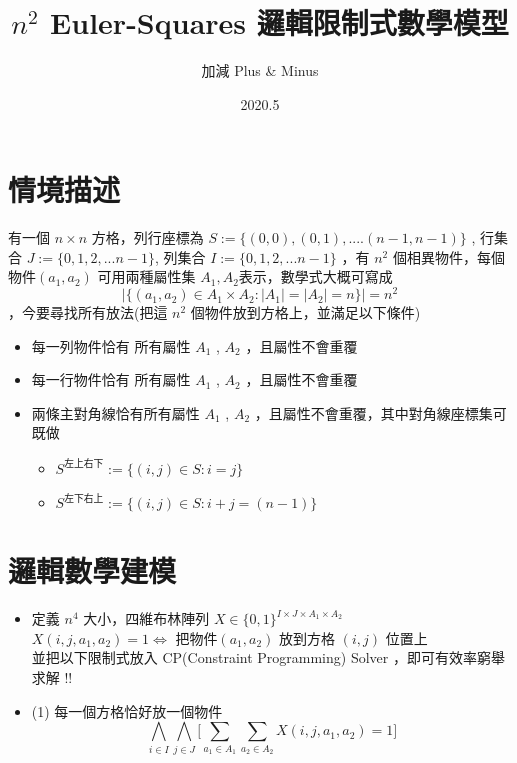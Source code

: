 \documentclass{article}
\begin{document}
\begin{CJK}{UTF8}{bsmi}


\title{$n^2$ Euler-Squares 邏輯限制式數學模型}
\date{2020.5}
\author{加減 Plus \& Minus}


\maketitle
\section{情境描述}
有一個 $n \times n$ 方格，列行座標為 $ S := \bigg\{(0,0),(0,1),....(n-1,n-1)\bigg\}$ , 行集合  $ J := \bigg\{0,1,2,...n-1 \bigg\}$,  列集合 $ I := \bigg\{0,1,2,...n-1 \bigg\}$ ，有 $n^2$ 個相異物件，每個物件$(a_1,a_2)$ 可用兩種屬性集 $A_1 , A_2$表示，數學式大概可寫成 $$\left|\bigg\{ (a_1,a_2) \in A_1 \times A_2 : |A_1| = |A_2| =n  \bigg\}\right| = n^2 $$ ，今要尋找{\color{red}所有放法}(把這 $n^2$ 個物件放到方格上，並滿足以下條件)
\begin{itemize}
\item 每一列物件恰有 所有屬性 $A_1$ , $A_2$ ，且屬性不會重覆
\item 每一行物件恰有 所有屬性 $A_1$ , $A_2$ ，且屬性不會重覆
\item 兩條主對角線恰有所有屬性 $A_1$ , $A_2$ ，且屬性不會重覆，其中對角線座標集可既做
\begin{itemize}
\item $S^{\text{左上右下}}:= \bigg\{(i,j) \in S : i=j \bigg \}$
\item $S^{\text{左下右上}} :=\bigg\{(i,j) \in S : i+j = (n-1) \bigg \} $

\end{itemize}
\end{itemize}
\newpage
\section{邏輯數學建模}
\begin{itemize}
\item 定義 $n^4$ 大小，四維布林陣列 $ X \in \bigg\{0,1\bigg\}^{I\times J \times A_1 \times A_2}$  \\  {\color{blue}$X(i,j,a_1,a_2) = 1  \iff  $ 把物件$(a_1,a_2)$ 放到方格 $(i,j)$ 位置上} \\ 
並把以下限制式放入 CP(Constraint Programming) Solver ，即可有效率窮舉求解 !!

\item (1) 每一個方格恰好放一個物件
		$$  \bigwedge_{i \in I}\bigwedge_{j \in J}  \bigg[\sum_{a_1 \in A_1}\sum_{a_2 \in A_2}X(i,j,a_1,a_2) =1  \bigg]$$


\end{itemize}
\end{CJK}
\end{document}
